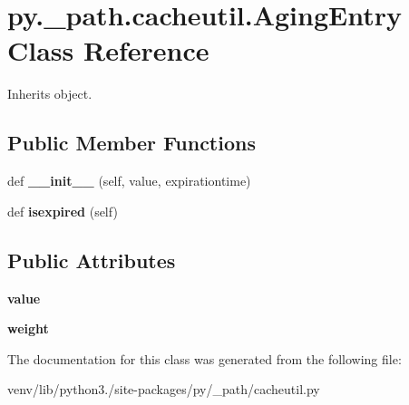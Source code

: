 \hypertarget{classpy_1_1__path_1_1cacheutil_1_1_aging_entry}{}\section{py.\+\_\+path.\+cacheutil.\+Aging\+Entry Class Reference}
\label{classpy_1_1__path_1_1cacheutil_1_1_aging_entry}


Inherits object.

\subsection*{Public Member Functions}
\begin{DoxyCompactItemize}
\item 
\mbox{\label{classpy_1_1__path_1_1cacheutil_1_1_aging_entry_abde9e10ea0134daa4d58ac13b7fa82c2}} 
def {\bfseries \+\_\+\+\_\+init\+\_\+\+\_\+} (self, value, expirationtime)
\item 
\mbox{\label{classpy_1_1__path_1_1cacheutil_1_1_aging_entry_a185fd2bab3f958402735e122d21bf4a5}} 
def {\bfseries isexpired} (self)
\end{DoxyCompactItemize}
\subsection*{Public Attributes}
\begin{DoxyCompactItemize}
\item 
\mbox{\label{classpy_1_1__path_1_1cacheutil_1_1_aging_entry_a7bbb9f86ccfc26427c5a6d740496770e}} 
{\bfseries value}
\item 
\mbox{\label{classpy_1_1__path_1_1cacheutil_1_1_aging_entry_aece182cc7295a6a190b04ddaac6c6c0e}} 
{\bfseries weight}
\end{DoxyCompactItemize}


The documentation for this class was generated from the following file\+:\begin{DoxyCompactItemize}
\item 
venv/lib/python3./site-\/packages/py/\+\_\+path/cacheutil.\+py\end{DoxyCompactItemize}
